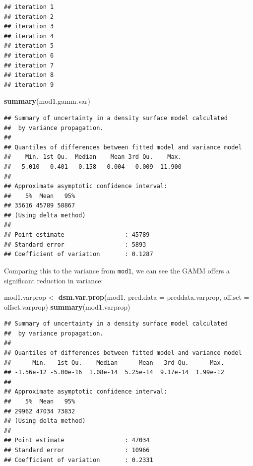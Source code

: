\documentclass[]{article}
\newenvironment{Shaded}{}{}
\newcommand{\KeywordTok}[1]{\textcolor[rgb]{0.00,0.44,0.13}{\textbf{{#1}}}}
\newcommand{\DataTypeTok}[1]{\textcolor[rgb]{0.56,0.13,0.00}{{#1}}}
\newcommand{\StringTok}[1]{\textcolor[rgb]{0.25,0.44,0.63}{{#1}}}
\newcommand{\NormalTok}[1]{{#1}}
\begin{document}
\begin{verbatim}
## iteration 1
## iteration 2
## iteration 3
## iteration 4
## iteration 5
## iteration 6
## iteration 7
## iteration 8
## iteration 9
\end{verbatim}

\begin{Shaded}
\begin{Highlighting}[]
\KeywordTok{summary}\NormalTok{(mod1.gamm.var)}
\end{Highlighting}
\end{Shaded}

\begin{verbatim}
## Summary of uncertainty in a density surface model calculated
##  by variance propagation.
## 
## Quantiles of differences between fitted model and variance model
##    Min. 1st Qu.  Median    Mean 3rd Qu.    Max. 
##  -5.010  -0.401  -0.158   0.004  -0.009  11.900 
## 
## Approximate asymptotic confidence interval:
##    5%  Mean   95% 
## 35616 45789 58867 
## (Using delta method)
## 
## Point estimate                 : 45789 
## Standard error                 : 5893 
## Coefficient of variation       : 0.1287
\end{verbatim}

Comparing this to the variance from \texttt{mod1}, we can see the GAMM
offers a significant reduction in variance:

\begin{Shaded}
\begin{Highlighting}[]
\NormalTok{mod1.varprop <-}\StringTok{ }\KeywordTok{dsm.var.prop}\NormalTok{(mod1, }\DataTypeTok{pred.data =} \NormalTok{preddata.varprop, }\DataTypeTok{off.set =} \NormalTok{offset.varprop)}
\KeywordTok{summary}\NormalTok{(mod1.varprop)}
\end{Highlighting}
\end{Shaded}

\begin{verbatim}
## Summary of uncertainty in a density surface model calculated
##  by variance propagation.
## 
## Quantiles of differences between fitted model and variance model
##      Min.   1st Qu.    Median      Mean   3rd Qu.      Max. 
## -1.56e-12 -5.00e-16  1.08e-14  5.25e-14  9.17e-14  1.99e-12 
## 
## Approximate asymptotic confidence interval:
##    5%  Mean   95% 
## 29962 47034 73832 
## (Using delta method)
## 
## Point estimate                 : 47034 
## Standard error                 : 10966 
## Coefficient of variation       : 0.2331
\end{verbatim}
\end{document}

